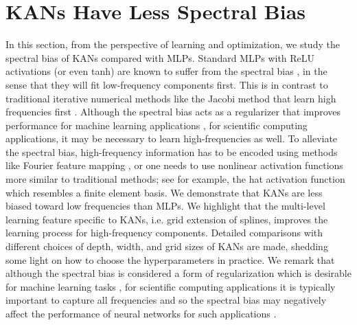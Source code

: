 \documentclass[12pt]{caltech_thesis}
\numberwithin{equation}{section}
\begin{document}
\section{KANs Have Less Spectral Bias}\label{sec:sp}
In this section, from the perspective of learning and optimization, we study the spectral bias of KANs compared with MLPs. Standard MLPs with ReLU activations (or even tanh) are known to suffer from the spectral bias \cite{rahaman2019spectral,xu2019frequency,xu2019training}, in the sense that they will fit low-frequency components first. This is in contrast to traditional iterative numerical methods like the Jacobi method that learn high frequencies first \cite{xu2019frequency}. Although the spectral bias acts as a regularizer that improves performance for machine learning applications \cite{rahaman2019spectral,zhang2021understanding,poggio2018theory,zhang2020rethink,fridovich2022spectral}, for scientific computing applications, it may be necessary to learn high-frequencies as well. 
To alleviate the spectral bias, high-frequency information has to be encoded using methods like Fourier feature mapping
\cite{sitzmann2020implicit,tancik2020fourier,benbarka2022seeing,novello2024taming}, or one needs to use nonlinear activation functions more similar to traditional methods; see for example, the hat activation function \cite{hong2022activation} which resembles a finite element basis. We demonstrate that KANs are less biased toward low frequencies than MLPs. We highlight that the multi-level learning feature specific to KANs, i.e. grid extension of splines, improves the learning process for high-frequency components.  Detailed comparisons with different choices of depth, width, and grid sizes of KANs are made, shedding some light on how to choose the hyperparameters in practice. 
 We remark that although the spectral bias is considered a form of regularization which is desirable for machine learning tasks \cite{rahaman2019spectral,zhang2021understanding,poggio2018theory,zhang2020rethink,fridovich2022spectral}, for scientific computing applications it is typically important to capture all frequencies and so the spectral bias may negatively affect the performance of neural networks for such applications \cite{wang2022and,rathorechallenges,cai2019multi,hong2022activation}. 
\end{document}
